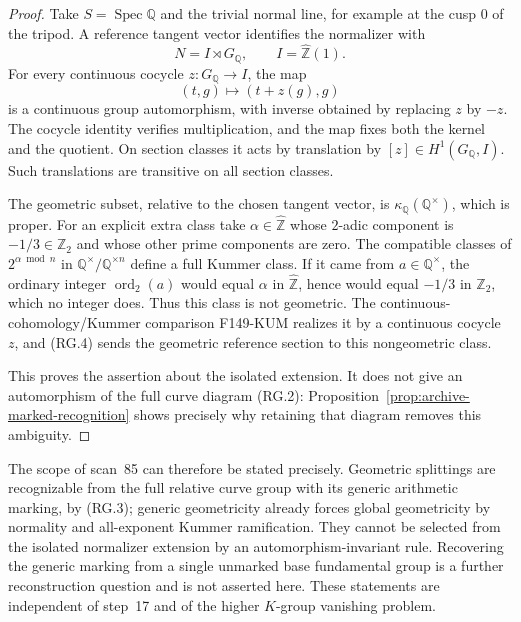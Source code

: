 \begin{proof}
Take $S=\operatorname{Spec}\mathbb Q$ and the trivial normal line,
for example at the cusp $0$ of the tripod. A reference tangent
vector identifies the normalizer with
\[
 N=I\rtimes G_{\mathbb Q},\qquad I=\widehat{\mathbb Z}(1).
\]
For every continuous cocycle $z:G_{\mathbb Q}\to I$, the map
\[
 (t,g)\longmapsto(t+z(g),g)                                 \tag{RG.4}
\]
is a continuous group automorphism, with inverse obtained by
replacing $z$ by $-z$. The cocycle identity verifies multiplication,
and the map fixes both the kernel and the quotient. On section
classes it acts by translation by $[z]\in H^1(G_{\mathbb Q},I)$.
Such translations are transitive on all section classes.

The geometric subset, relative to the chosen tangent vector, is
$\kappa_{\mathbb Q}(\mathbb Q^\times)$, which is proper.
For an explicit extra class take
$\alpha\in\widehat{\mathbb Z}$ whose $2$-adic component is
$-1/3\in\mathbb Z_2$ and whose other prime components are zero.
The compatible classes of $2^{\alpha\bmod n}$ in
$\mathbb Q^\times/\mathbb Q^{\times n}$ define a full Kummer class.
If it came from $a\in\mathbb Q^\times$, the ordinary integer
$\operatorname{ord}_2(a)$ would equal $\alpha$ in
$\widehat{\mathbb Z}$, hence would equal $-1/3$ in $\mathbb Z_2$,
which no integer does. Thus this class is not geometric.
The continuous-cohomology/Kummer comparison F149-KUM realizes it
by a continuous cocycle $z$, and (RG.4) sends the geometric
reference section to this nongeometric class.

This proves the assertion about the isolated extension. It does
not give an automorphism of the full curve diagram (RG.2):
Proposition~\ref{prop:archive-marked-recognition} shows precisely
why retaining that diagram removes this ambiguity.
\end{proof}

The scope of scan~85 can therefore be stated precisely. Geometric
splittings are recognizable from the full relative curve group
with its generic arithmetic marking, by (RG.3); generic geometricity
already forces global geometricity by normality and all-exponent
Kummer ramification. They cannot be selected from the isolated
normalizer extension by an automorphism-invariant rule. Recovering
the generic marking from a single unmarked base fundamental group
is a further reconstruction question and is not asserted here.
These statements are independent of step~17 and of the higher
$K$-group vanishing problem.

